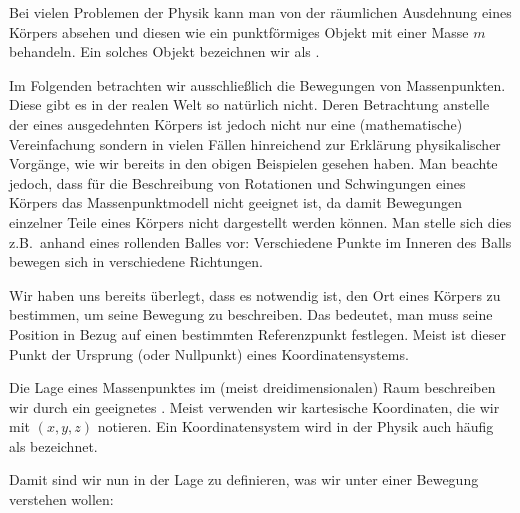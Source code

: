 \begin{MContent}

\begin{MInfo}
  Bei vielen Problemen der Physik kann man von der r\"aumlichen Ausdehnung eines K\"orpers absehen und diesen wie ein punktf\"ormiges Objekt mit einer Masse $m$ behandeln. Ein solches Objekt bezeichnen wir als . 
\end{MInfo}

Im Folgenden betrachten wir ausschlie{\ss}lich die Bewegungen von Massenpunkten. Diese gibt es in der realen Welt so nat\"urlich nicht. Deren Betrachtung anstelle der 
eines ausgedehnten K\"orpers ist jedoch nicht nur eine (mathematische) Vereinfachung sondern in vielen F\"allen hinreichend zur Erkl\"arung physikalischer Vorg\"ange, wie wir bereits in den obigen Beispielen gesehen haben. Man beachte jedoch, dass f\"ur die Beschreibung von Rotationen und Schwingungen eines K\"orpers das Massenpunktmodell nicht geeignet ist, da damit Bewegungen einzelner Teile eines K\"orpers nicht dargestellt werden k\"onnen. Man stelle sich dies z.B.~anhand eines rollenden Balles vor: Verschiedene Punkte im Inneren des Balls bewegen sich in verschiedene Richtungen.
 


Wir haben uns bereits \"uberlegt, dass es notwendig ist, den Ort eines K\"orpers zu  bestimmen, um seine Bewegung zu beschreiben. Das bedeutet, man muss seine Position in Bezug auf einen bestimmten Referenzpunkt festlegen. Meist ist dieser Punkt der Ursprung (oder Nullpunkt) eines Koordinatensystems. 
\begin{MInfo}
  Die Lage eines Massenpunktes im (meist dreidimensionalen) Raum beschreiben wir durch ein geeignetes . Meist verwenden wir kartesische Koordinaten, die wir mit $(x,y,z)$ notieren. Ein Koordinatensystem wird in der Physik auch h\"aufig als  bezeichnet.
\end{MInfo}

Damit sind wir nun in der Lage zu definieren, was wir unter einer Bewegung verstehen wollen:


\end{MContent}
